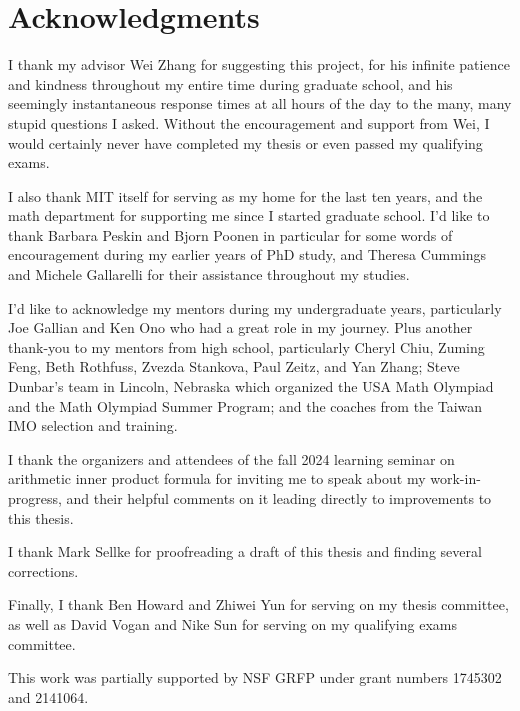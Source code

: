 

\chapter*{Acknowledgments}

I thank my advisor Wei Zhang for suggesting this project,
for his infinite patience and kindness throughout my entire time during graduate school,
and his seemingly instantaneous response times at all hours of the day
to the many, many stupid questions I asked.
Without the encouragement and support from Wei,
I would certainly never have completed my thesis or even passed my qualifying exams.

I also thank MIT itself for serving as my home for the last ten years,
and the math department for supporting me since I started graduate school.
I'd like to thank Barbara Peskin and Bjorn Poonen in particular
for some words of encouragement during my earlier years of PhD study,
and Theresa Cummings and Michele Gallarelli for their assistance throughout my studies.

I'd like to acknowledge my mentors during my undergraduate years,
particularly Joe Gallian and Ken Ono who had a great role in my journey.
Plus another thank-you to my mentors from high school, particularly
Cheryl Chiu, Zuming Feng, Beth Rothfuss, Zvezda Stankova, Paul Zeitz, and Yan Zhang;
Steve Dunbar's team in Lincoln, Nebraska which organized the USA Math Olympiad
and the Math Olympiad Summer Program;
and the coaches from the Taiwan IMO selection and training.

I thank the organizers and attendees of the fall 2024
learning seminar on arithmetic inner product formula
for inviting me to speak about my work-in-progress, and their helpful comments on it
leading directly to improvements to this thesis.

I thank Mark Sellke for proofreading a draft of this thesis
and finding several corrections.

Finally, I thank Ben Howard and Zhiwei Yun for serving on my thesis committee,
as well as David Vogan and Nike Sun for serving on my qualifying exams committee.

This work was partially supported by NSF GRFP under grant numbers 1745302 and 2141064.

